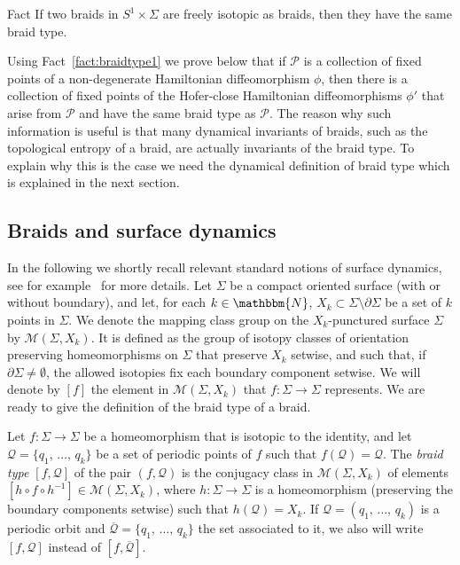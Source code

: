 \documentclass[AHL,Unicode,longabstracts,published]{cedram}
\newcommand{\N}{\mathbbm{N}}
\newcommand{\clP}{\mathcal{P}}
\newcommand{\clQ}{\mathcal{Q}}
\newcommand{\clM}{\mathcal{M}}
\begin{document}
\begin{enonce}{Fact} \label{fact:braidtype1}
If two braids in $S^1 \times \Sigma$ are freely isotopic as braids, then they have the same braid type.
\end{enonce}

Using Fact~\ref{fact:braidtype1} we prove below that if ${\clP}$ is a collection of fixed points of a non-degenerate Hamiltonian diffeomorphism $\phi$, then there is a collection of fixed points of the Hofer-close Hamiltonian diffeomorphisms $\phi'$ that arise from ${\clP}$ and have the same braid type as ${\clP}$. The reason why such information is useful is that many dynamical invariants of braids, such as the topological entropy of a braid, are actually invariants of the braid type. To explain why this is the case we need the dynamical definition of braid type which is explained in the next section.



\subsection{Braids and surface dynamics} \label{sec:braids}

In the following we shortly recall relevant standard notions of surface dynamics, see for example~\cite{Birman, Boyland, FranksMisiurewicz2002} for more details. Let $\Sigma$ be a compact oriented surface (with or without boundary), and let, for each $k\in \N$, $X_k \subset \Sigma\setminus \partial \Sigma$ be a set of $k$ points in $\Sigma$. We denote the mapping class group on the $X_k$-punctured surface $\Sigma$ by $\clM(\Sigma, X_k)$. It is defined as the group of isotopy classes of orientation preserving homeomorphisms on $\Sigma$ that preserve $X_k$ setwise, and such that, if $\partial \Sigma \neq \emptyset$, the allowed isotopies fix each boundary component setwise. We will denote by $[f]$ the element in $\clM(\Sigma, X_k)$ that $f:\Sigma \to \Sigma$ represents. We are ready to give the definition of the braid type of a braid.

\begin{defi} \label{def:braidtype2}
Let $f:\Sigma \to \Sigma$ be a homeomorphism that is isotopic to the identity, and let $\clQ = \{q_1,\, \ldots,\, q_{k}\}$ be a set of periodic points of $f$ such that $f(\clQ)= \clQ$. The \emph{braid type $[f,\clQ]$} of the pair $(f,\clQ)$ is the conjugacy class in $\clM(\Sigma,X_k)$ of elements $[h \circ f \circ h^{-1}]\in \clM(\Sigma, X_k)$, where $h:\Sigma \to \Sigma$ is a homeomorphism (preserving the boundary components setwise) such that $h({\clQ}) = X_k$. If $\clQ = (q_1,\,\ldots,\,q_k)$ is a periodic orbit and $\overline{\clQ} = \{q_1,\,\ldots,\,q_k\}$ the set associated to it, we also will write $[f,\clQ]$ instead of $[f,\overline{\clQ}]$.
\end{defi}
\end{document}
